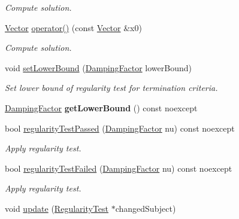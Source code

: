 \begin{DoxyCompactItemize}
\begin{DoxyCompactList}\small\item\em Compute solution. \end{DoxyCompactList}\item 
\hyperlink{classSpacy_1_1Vector}{Vector} \hyperlink{classSpacy_1_1CompositeStep_1_1AffineCovariantSolver_ae08612c2a1ca88d9a3746766bd5c1035}{operator()} (const \hyperlink{classSpacy_1_1Vector}{Vector} \&x0)
\begin{DoxyCompactList}\small\item\em Compute solution. \end{DoxyCompactList}\item 
\hypertarget{classSpacy_1_1Mixin_1_1RegularityTest_a682ce022b0b5493e48f50f693ed64082}{void \hyperlink{classSpacy_1_1Mixin_1_1RegularityTest_a682ce022b0b5493e48f50f693ed64082}{set\-Lower\-Bound} (\hyperlink{classSpacy_1_1DampingFactor}{Damping\-Factor} lower\-Bound)}\label{classSpacy_1_1Mixin_1_1RegularityTest_a682ce022b0b5493e48f50f693ed64082}

\begin{DoxyCompactList}\small\item\em Set lower bound of regularity test for termination criteria. \end{DoxyCompactList}\item 
\hypertarget{classSpacy_1_1Mixin_1_1RegularityTest_a576995201badbfaee2064bf0d7749257}{\hyperlink{classSpacy_1_1DampingFactor}{Damping\-Factor} {\bfseries get\-Lower\-Bound} () const noexcept}\label{classSpacy_1_1Mixin_1_1RegularityTest_a576995201badbfaee2064bf0d7749257}

\item 
bool \hyperlink{classSpacy_1_1Mixin_1_1RegularityTest_acb6b3e8c76ebdbded0ec610959513caf}{regularity\-Test\-Passed} (\hyperlink{classSpacy_1_1DampingFactor}{Damping\-Factor} nu) const noexcept
\begin{DoxyCompactList}\small\item\em Apply regularity test. \end{DoxyCompactList}\item 
bool \hyperlink{classSpacy_1_1Mixin_1_1RegularityTest_aeb1a3b051bafc9da9be1df354c652812}{regularity\-Test\-Failed} (\hyperlink{classSpacy_1_1DampingFactor}{Damping\-Factor} nu) const noexcept
\begin{DoxyCompactList}\small\item\em Apply regularity test. \end{DoxyCompactList}\item 
\hypertarget{classSpacy_1_1Mixin_1_1RegularityTest_a1a6191e20f84025cec8b10ec63ab94ac}{void \hyperlink{classSpacy_1_1Mixin_1_1RegularityTest_a1a6191e20f84025cec8b10ec63ab94ac}{update} (\hyperlink{classSpacy_1_1Mixin_1_1RegularityTest_a548d9d45c31c7833266bd3b20dc1aa7e}{Regularity\-Test} $\ast$changed\-Subject)}\label{classSpacy_1_1Mixin_1_1RegularityTest_a1a6191e20f84025cec8b10ec63ab94ac}


\end{DoxyCompactItemize}
